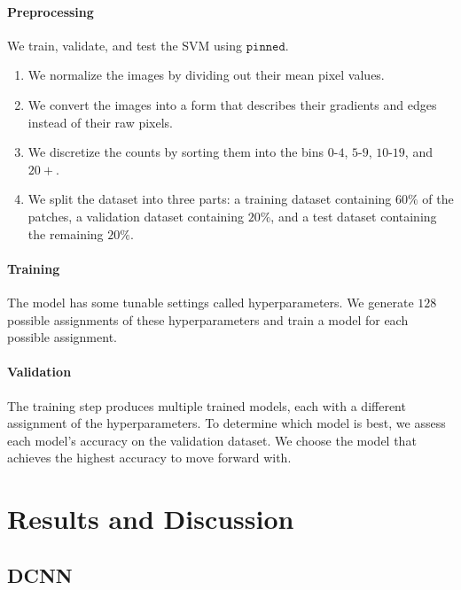 \documentclass[10pt,letterpaper]{article}
\begin{document}
        \paragraph*{Preprocessing}
            We train, validate, and test the SVM using $\texttt{pinned}$.
        
            \begin{enumerate}
                \item We normalize the images by dividing out their mean pixel values.
        
                \item We convert the images into a form that describes their gradients and edges instead of their raw pixels.
        
                \item We discretize the counts by sorting them into the bins $0$-$4$, $5$-$9$, $10$-$19$, and $20+$.
        
                \item We split the dataset into three parts: a training dataset containing $60\%$ of the patches, a validation dataset containing $20\%$, and a test dataset containing the remaining $20\%$.
            \end{enumerate}

        \paragraph*{Training}
            The model has some tunable settings called hyperparameters. We generate $128$ possible assignments of these hyperparameters and train a model for each possible assignment.

        \paragraph*{Validation}
            The training step produces multiple trained models, each with a different assignment of the hyperparameters. To determine which model is best, we assess each model's accuracy on the validation dataset. We choose the model that achieves the highest accuracy to move forward with.

\section*{Results and Discussion}
    \subsection*{DCNN} \label{ssec:dcnn_results}
\end{document}
